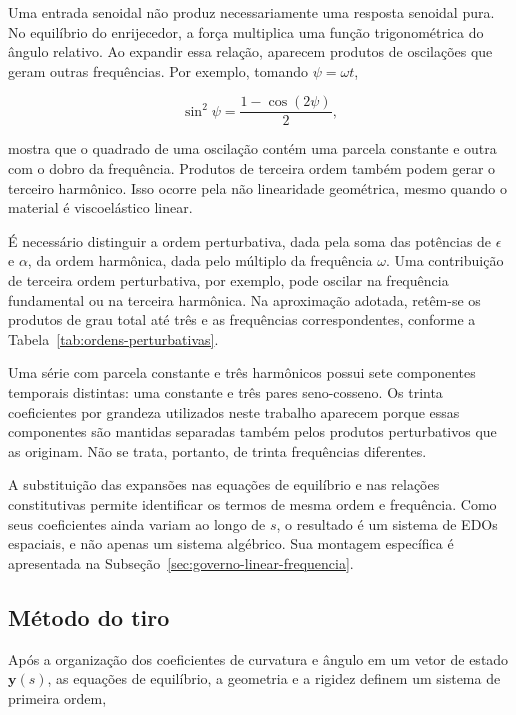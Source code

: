 \documentclass[arial,centeredequations,english,brazilian,oneside,section=TITLE]{ifes8}
\begin{document}
Uma entrada senoidal não produz necessariamente uma resposta senoidal pura.
No equilíbrio do enrijecedor, a força multiplica uma função trigonométrica do
ângulo relativo. Ao expandir essa relação, aparecem produtos de oscilações que
geram outras frequências. Por exemplo, tomando $\psi=\omega t$,

\begin{equation}
  \sin^2\psi=\frac{1-\cos(2\psi)}{2},
  \label{eq:geracao-segundo-harmonico}
\end{equation}

mostra que o quadrado de uma oscilação contém uma parcela constante e outra com
o dobro da frequência. Produtos de terceira ordem também podem gerar o terceiro
harmônico. Isso ocorre pela não linearidade geométrica, mesmo quando o material
é viscoelástico linear.

É necessário distinguir a ordem perturbativa, dada pela soma das potências de
$\epsilon$ e $\alpha$, da ordem harmônica, dada pelo múltiplo da frequência
$\omega$. Uma contribuição de terceira ordem perturbativa, por exemplo, pode
oscilar na frequência fundamental ou na terceira harmônica. Na aproximação adotada,
retêm-se os produtos de grau total até três e as frequências correspondentes,
conforme a Tabela~\ref{tab:ordens-perturbativas}.

Uma série com parcela constante e três harmônicos possui sete componentes temporais
distintas: uma constante e três pares seno-cosseno. Os trinta coeficientes por
grandeza utilizados neste trabalho aparecem porque essas componentes são mantidas
separadas também pelos produtos perturbativos que as originam. Não se trata,
portanto, de trinta frequências diferentes.

A substituição das expansões nas equações de equilíbrio e nas relações constitutivas
permite identificar os termos de mesma ordem e frequência. Como seus coeficientes
ainda variam ao longo de $s$, o resultado é um sistema de EDOs espaciais, e não
apenas um sistema algébrico. Sua montagem específica é apresentada na
Subseção~\ref{sec:governo-linear-frequencia}.

\subsection{Método do tiro}
\label{subsec:metodo-tiro}

Após a organização dos coeficientes de curvatura e ângulo em um vetor de estado
$\mathbf y(s)$, as equações de equilíbrio, a geometria e a rigidez definem um
sistema de primeira ordem,
\end{document}

